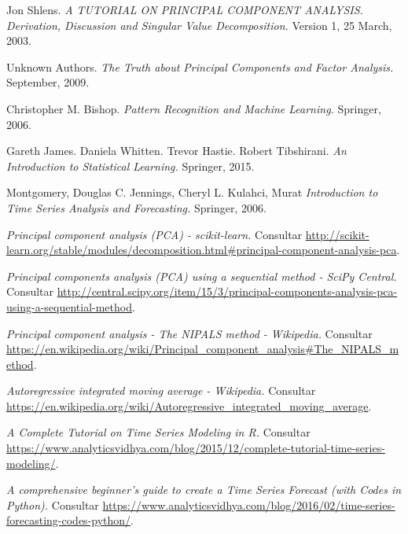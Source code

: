 \documentclass[11pt,spanish,listoffigures,listoftables]{tfgetsinf}
\begin{document}
\begin{thebibliography}{10}

   Jon Shlens.
   \newblock \textit{A TUTORIAL ON PRINCIPAL COMPONENT ANALYSIS. Derivation, Discussion and Singular Value Decomposition.}
   \newblock Version 1, 25 March, 2003.

   Unknown Authors.
   \newblock \textit{The Truth about Principal Components and Factor Analysis.}
    September, 2009.
   
   Christopher M. Bishop.
   \newblock \textit{Pattern Recognition and Machine Learning.}
   \newblock Springer, 2006.   

   Gareth James.
   Daniela Whitten.
   Trevor Hastie.
   Robert Tibshirani.
   \newblock \textit{An Introduction to Statistical Learning.}
   \newblock Springer, 2015.

   Montgomery, Douglas C.
   Jennings, Cheryl L.
   Kulahci, Murat
   \newblock \textit{Introduction to Time Series Analysis and Forecasting.}
   \newblock Springer, 2006.

   \textit{Principal component analysis (PCA) - scikit-learn.}
   \newblock Consultar 
   \url{http://scikit-learn.org/stable/modules/decomposition.html#principal-component-analysis-pca}.

   \textit{Principal components analysis (PCA) using a sequential method - SciPy Central.}
   \newblock Consultar 
   \url{http://central.scipy.org/item/15/3/principal-components-analysis-pca-using-a-sequential-method}.

   \textit{Principal component analysis - The NIPALS method - Wikipedia.}
   \newblock Consultar 
   \url{https://en.wikipedia.org/wiki/Principal_component_analysis#The_NIPALS_method}.

   \textit{Autoregressive integrated moving average - Wikipedia.}
   \newblock Consultar 
   \url{https://en.wikipedia.org/wiki/Autoregressive_integrated_moving_average}.

   \textit{A Complete Tutorial on Time Series Modeling in R.}
   \newblock Consultar 
   \url{https://www.analyticsvidhya.com/blog/2015/12/complete-tutorial-time-series-modeling/}.

   \textit{A comprehensive beginner’s guide to create a Time Series Forecast (with Codes in Python).}
   \newblock Consultar 
   \url{https://www.analyticsvidhya.com/blog/2016/02/time-series-forecasting-codes-python/}.


\end{thebibliography}
\end{document}
